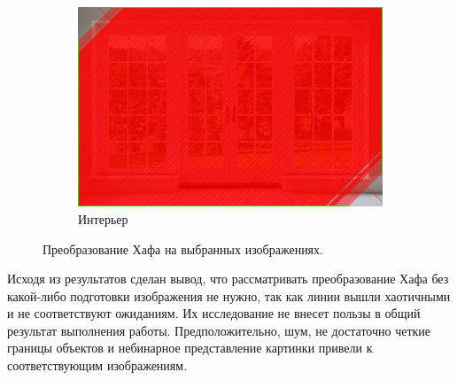 \documentclass[a4paper, 16pt]{article}
\begin{document}
\begin{figure}[htbp]
\begin{subfigure}{0.3\textwidth}
            \centering
            \includegraphics[width=\linewidth]{hl_i3.png}
            \caption{Интерьер}
            \label{fig:hl_i3}
        \end{subfigure}
        \caption{Преобразование Хафа на выбранных изображениях.}
        \label{fig:hl_is}
    \end{figure}


    \noindent Исходя из результатов сделан вывод, что рассматривать преобразование Хафа без какой-либо
    подготовки изображения не нужно, так как линии вышли хаотичными и не соответствуют ожиданиям. Их
    исследование не внесет пользы в общий результат выполнения работы. Предположительно, шум, не достаточно
    четкие границы объектов и небинарное представление картинки привели к соответствующим изображениям.
\end{document}
